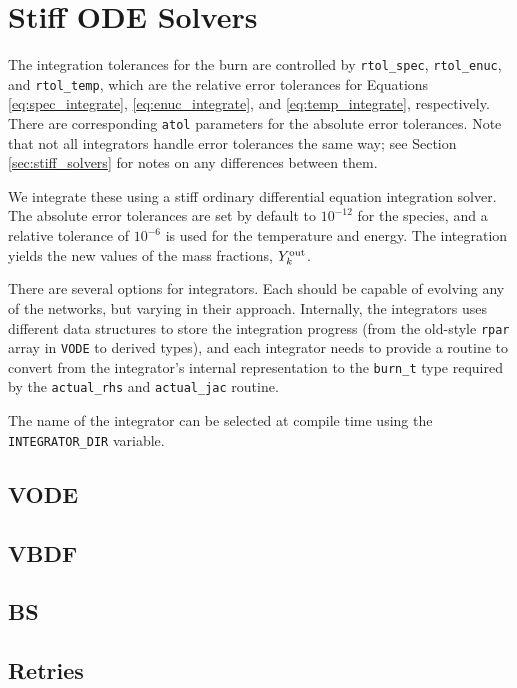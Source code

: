 \section{Stiff ODE Solvers}
\label{ch:networks:integrators}

The integration tolerances for the burn are controlled by
\texttt{rtol\_spec}, \texttt{rtol\_enuc}, and \texttt{rtol\_temp},
which are the relative error tolerances for Equations
\ref{eq:spec_integrate}, \ref{eq:enuc_integrate}, and
\ref{eq:temp_integrate}, respectively. There are corresponding
\texttt{atol} parameters for the absolute error tolerances. Note that
not all integrators handle error tolerances the same way; see Section
\ref{sec:stiff_solvers} for notes on any differences between them.

We integrate these using a stiff ordinary differential equation
integration solver. The absolute error tolerances are set by default
to $10^{-12}$ for the species, and a relative tolerance of $10^{-6}$
is used for the temperature and energy.  The integration
yields the new values of the mass fractions, $Y_k^{\rm out}$.

There are several options for integrators.  Each should be capable of
evolving any of the networks, but varying in their approach.  Internally,
the integrators uses different data structures to store the integration
progress (from the old-style {\tt rpar} array in {\tt VODE} to derived
types), and each integrator needs to provide a routine to convert
from the integrator's internal representation to the {\tt burn\_t}
type required by the {\tt actual\_rhs} and {\tt actual\_jac} routine.

The name of the integrator can be selected at compile time using
the {\tt INTEGRATOR\_DIR} variable.


\subsection{VODE}
\label{sec:VODE}

\subsection{VBDF}
\label{sec:VBDF}

\subsection{BS}
\label{sec:BS}

\subsection{Retries}


